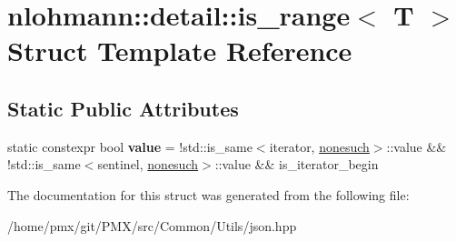 \hypertarget{structnlohmann_1_1detail_1_1is__range}{}\section{nlohmann\+:\+:detail\+:\+:is\+\_\+range$<$ T $>$ Struct Template Reference}
\label{structnlohmann_1_1detail_1_1is__range}
\subsection*{Static Public Attributes}
\begin{DoxyCompactItemize}
\item 
\mbox{\label{structnlohmann_1_1detail_1_1is__range_af7cd9fa19ca24709795adaae999e8ce9}} 
static constexpr bool {\bfseries value} = !std\+::is\+\_\+same$<$iterator, \hyperlink{structnlohmann_1_1detail_1_1nonesuch}{nonesuch}$>$\+::value \&\& !std\+::is\+\_\+same$<$sentinel, \hyperlink{structnlohmann_1_1detail_1_1nonesuch}{nonesuch}$>$\+::value \&\& is\+\_\+iterator\+\_\+begin
\end{DoxyCompactItemize}


The documentation for this struct was generated from the following file\+:\begin{DoxyCompactItemize}
\item 
/home/pmx/git/\+P\+M\+X/src/\+Common/\+Utils/json.\+hpp\end{DoxyCompactItemize}
